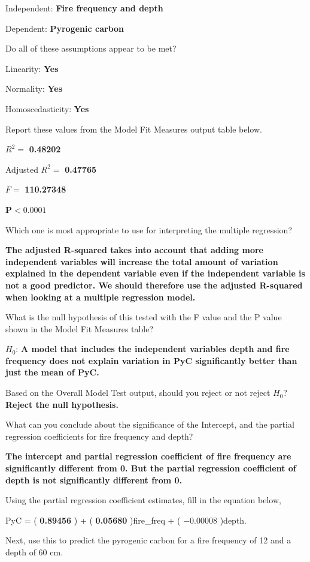 \documentclass[
  openany]{krantz}
\begin{document}
Independent: \textbf{Fire frequency and depth}

Dependent: \textbf{Pyrogenic carbon}

Do all of these assumptions appear to be met?

Linearity: \textbf{Yes}

Normality: \textbf{Yes}

Homoscedasticity: \textbf{Yes}

Report these values from the Model Fit Measures output table below.

\(R^{2} =\) \textbf{0.48202}

Adjusted \(R^{2} =\) \textbf{0.47765}

\(F =\) \textbf{110.27348}

\textbf{\(\mathbf{P < 0.0001}\)}

Which one is most appropriate to use for interpreting the multiple regression?

\textbf{The adjusted R-squared takes into account that adding more independent variables will increase the total amount of variation explained in the dependent variable even if the independent variable is not a good predictor. We should therefore use the adjusted R-squared when looking at a multiple regression model.}

What is the null hypothesis of this tested with the F value and the P value shown in the Model Fit Measures table?

\(H_{0}\): \textbf{A model that includes the independent variables depth and fire frequency does not explain variation in PyC significantly better than just the mean of PyC.}

Based on the Overall Model Test output, should you reject or not reject \(H_{0}\)? \textbf{Reject the null hypothesis.}

What can you conclude about the significance of the Intercept, and the partial regression coefficients for fire frequency and depth?

\textbf{The intercept and partial regression coefficient of fire frequency are significantly different from 0. But the partial regression coefficient of depth is not significantly different from 0.}

Using the partial regression coefficient estimates, fill in the equation below,

PyC = ( \textbf{0.89456} ) + ( \textbf{0.05680} )fire\_freq + ( \(\mathbf{-0.00008}\) )depth.

Next, use this to predict the pyrogenic carbon for a fire frequency of 12 and a depth of 60 cm.
\end{document}
